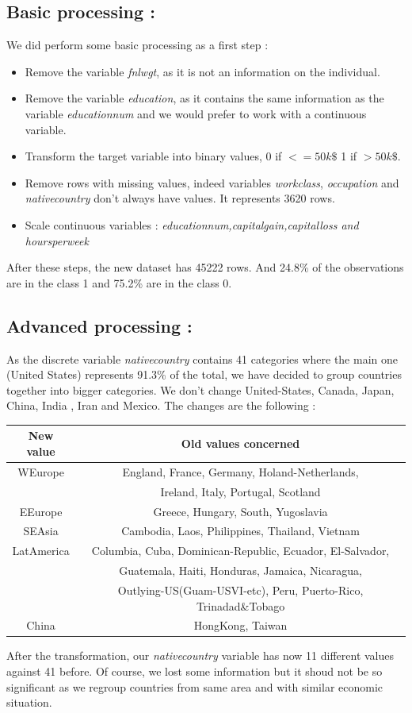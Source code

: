 \documentclass[11pt]{article}
\begin{document}
\subsection{Basic processing : }
We did perform some basic processing as a first step : 
\begin{itemize}
\item Remove the variable \emph{fnlwgt}, as it is not an information on the individual.
\item Remove the variable \emph{education}, as it contains the same information as the variable \emph{educationnum} and we would prefer to work with a continuous variable.
\item Transform the target variable into binary values,  0 if $<=50k\$$ 1 if $>50k\$$.
\item Remove rows with missing values, indeed variables \emph{workclass}, \emph{occupation} and \emph{nativecountry} don't always have values. It represents 3620 rows.
\item Scale continuous variables : \emph{educationnum,capitalgain,capitalloss and hoursperweek}
\end{itemize}
After these steps, the new dataset has 45222 rows. And 24.8\% of the observations are in the class 1 and 75.2\% are in the class 0.
\subsection{Advanced processing :}
As the discrete variable \emph{nativecountry} contains 41 categories where the main one (United States) represents 91.3\% of the total, we have decided to group countries together into bigger categories. We don't change United-States, Canada, Japan, China, India , Iran and Mexico. The changes are the following :

\begin{center}

\begin{tabular}{|c|c|}
\hline
New value & Old values concerned \\
\hline
WEurope & England, France, Germany, Holand-Netherlands,\\
& Ireland, Italy, Portugal, Scotland\\
\hline
EEurope & Greece, Hungary, South, Yugoslavia\\
\hline
SEAsia & Cambodia, Laos, Philippines, Thailand, Vietnam\\
\hline
 LatAmerica & Columbia, Cuba, Dominican-Republic, Ecuador, El-Salvador, \\
&Guatemala, Haiti, Honduras, Jamaica, Nicaragua, \\
&Outlying-US(Guam-USVI-etc), Peru, Puerto-Rico, Trinadad\&Tobago \\
\hline
China & HongKong, Taiwan \\
\hline
\end{tabular}
\end{center}
After the transformation, our \emph{nativecountry} variable has now 11 different values against 41 before. Of course, we lost some information but it shoud not be so significant as we regroup countries from same area and with similar economic situation.
\end{document}

